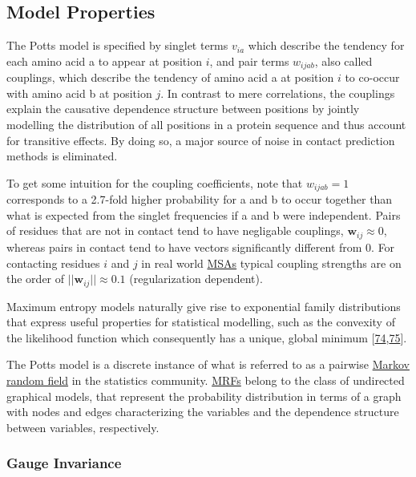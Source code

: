 \documentclass[12pt,a4paper,twoside]{book}
\newcommand{\via}{v_{ia}}
\newcommand{\wij}{\mathbf{w}_{ij}}
\newcommand{\wijab}{w_{ijab}}
\theoremstyle{definition}
\theoremstyle{definition}
\theoremstyle{remark}
\begin{document}
\subsection{Model Properties}\label{potts-model-properties}

The Potts model is specified by singlet terms \(\via\) which describe
the tendency for each amino acid a to appear at position \(i\), and pair
terms \(\wijab\), also called couplings, which describe the tendency of
amino acid a at position \(i\) to co-occur with amino acid b at position
\(j\). In contrast to mere correlations, the couplings explain the
causative dependence structure between positions by jointly modelling
the distribution of all positions in a protein sequence and thus account
for transitive effects. By doing so, a major source of noise in contact
prediction methods is eliminated.

To get some intuition for the coupling coefficients, note that
\(\wijab = 1\) corresponds to a 2.7-fold higher probability for a and b
to occur together than what is expected from the singlet frequencies if
a and b were independent. Pairs of residues that are not in contact tend
to have negligable couplings, \(\wij \approx 0\), whereas pairs in
contact tend to have vectors significantly different from 0. For
contacting residues \(i\) and \(j\) in real world
\protect\hyperlink{abbrev}{MSAs} typical coupling strengths are on the
order of \(||\wij || \approx 0.1\) (regularization dependent).

Maximum entropy models naturally give rise to exponential family
distributions that express useful properties for statistical modelling,
such as the convexity of the likelihood function which consequently has
a unique, global minimum
{[}\protect\hyperlink{ref-Wainwright2007}{74},\protect\hyperlink{ref-Murphy2012}{75}{]}.

The Potts model is a discrete instance of what is referred to as a
pairwise \protect\hyperlink{abbrev}{Markov random field} in the
statistics community. \protect\hyperlink{abbrev}{MRFs} belong to the
class of undirected graphical models, that represent the probability
distribution in terms of a graph with nodes and edges characterizing the
variables and the dependence structure between variables, respectively.

\subsubsection{Gauge Invariance}\label{gauge-invariance}
\end{document}
